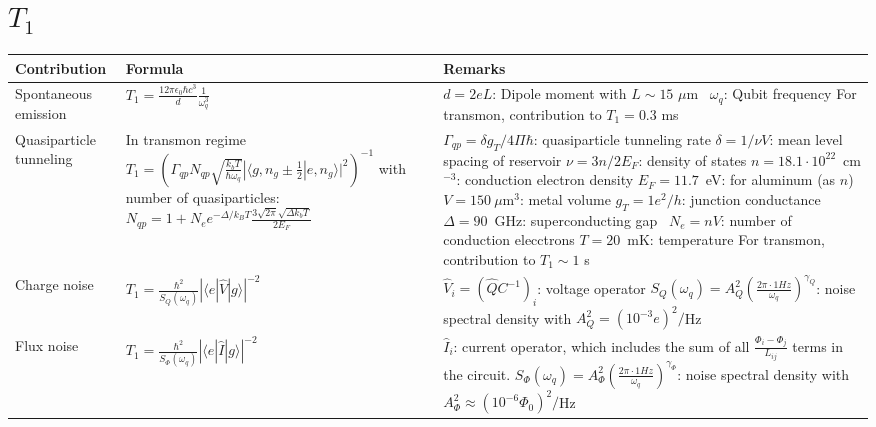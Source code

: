 \documentclass[]{article}
\newcommand{\ket}[1]{| #1 \rangle}
\newcommand{\bra}[1]{\langle #1 |}
\begin{document}
\section{$T_1$}
\begin{table}[h]
\centering
\begin{tabular}{|p{2cm}|p{5.5cm}|p{7.5cm}|}
	\hline 
Contribution	& Formula & Remarks \\ 
\hline \hline 
Spontaneous emission & $T_1 = \frac{12 \pi \epsilon_0 \hbar c^3}{d} \frac{1}{\omega_q^3}$~\cite{koch2007} & $d=2eL$: Dipole moment with $L\sim 15$ $\mu$m~\cite{koch2007} \newline $\omega_q$: Qubit frequency \newline
For transmon, contribution to $T_1=0.3$ ms~\cite{koch2007} \\
\hline
Quasiparticle tunneling & In transmon regime~\cite{koch2007} \newline $T_1 = \left( \Gamma_{qp} N_{qp} \sqrt{\frac{k_b T}{\hbar \omega_q}} | \langle g, n_g \pm \frac{1}{2} | e, n_g \rangle |^2 \right)^{-1}$ \newline
with number of quasiparticles: \newline $N_{qp} = 1 +N_e e^{-\Delta/k_BT}\frac{3\sqrt{2\pi} \sqrt{\Delta k_b T}}{2E_F}$
 & $\Gamma_{qp} =\delta g_T  / 4 \Pi \hbar $: quasiparticle tunneling rate  \newline
$\delta = 1  /  \nu V$: mean level spacing of reservoir \newline
$\nu = 3n/2E_F$: density of states \newline
$n = 18.1 \cdot 10^{22}$~cm${}^{-3}$: conduction electron density \newline
$E_F=11.7$~eV: for aluminum (as $n$) \newline
$V=150~\mu$m${}^3$: metal volume \newline
$g_T=1e^2/h$: junction conductance \newline
$\Delta=90$~GHz: superconducting gap~\cite{delta} \newline
$N_e=nV$: number of conduction elecctrons \newline
$T=20$~mK: temperature  \newline
For transmon, contribution to  $T_1 \sim 1$ s~\cite{koch2007} \\
\hline 
Charge noise & $T_1 = \frac{\hbar^2}{S_{Q}(\omega_q)} \left| \bra{e} \hat{V} \ket{g} \right|^{-2}$~\cite{yan2016}
& $\hat{V}_i=\left(\hat{Q}C^{-1} \right)_i$: voltage operator \newline 
$S_{Q}(\omega_q)=A_Q^2\left( \frac{2\pi \cdot 1 Hz}{\omega_q} \right)^{\gamma_Q}$: noise spectral density with $A_Q^2=(10^{-3}e)^2/$Hz~\cite{krantz2019} \\
\hline
Flux noise & $T_1 = \frac{\hbar^2}{S_{\Phi}(\omega_q)} \left| \bra{e} \hat{I} \ket{g} \right|^{-2}$~\cite{yan2016}
& $\hat{I}_i$: current operator, which includes the sum of all $\frac{\Phi_i-\Phi_j}{L_{ij}}$ terms in the circuit. \newline 
$S_{\Phi}(\omega_q)=A_{\Phi}^2\left( \frac{2\pi \cdot 1 Hz}{\omega_q} \right)^{\gamma_{\Phi}}$: noise spectral density with $A_{\Phi}^2\approx(10^{-6} \Phi_0)^2/$Hz~\cite{krantz2019} \\
\hline


\end{tabular}
\end{table}
\end{document}
